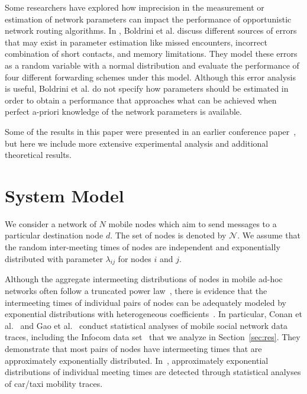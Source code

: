 \documentclass[journal,onecolumn,11pt]{IEEEtran}
\theoremstyle{plain}
\theoremstyle{definition}
\begin{document}
Some researchers have explored how imprecision in the measurement
or estimation of network parameters can impact the performance of
opportunistic network routing algorithms. In \cite
{boldrini2010modelling, boldrini2012performance}, Boldrini
et al. discuss different sources of errors that may exist in parameter
estimation like missed encounters, incorrect combination of short
contacts, and memory limitations. They model these errors
as a random variable with a normal distribution and evaluate the
performance of four different forwarding schemes under this
model. Although this error analysis is useful, Boldrini et al. do not
specify how parameters should be estimated in order to obtain a
performance that approaches what can be achieved when perfect a-priori
knowledge of the network parameters is available.

Some of the results in this paper were presented in an earlier
conference paper~\cite{shaghaghian2014opportunistic}, but here we include more extensive experimental
analysis and additional theoretical results.

\section{System Model} \label{sec:system_model}
We consider a network of $N$ mobile nodes which aim to send messages
to a particular destination node $d$. The set of nodes is denoted by
$\mathcal{N}$. We assume that the random inter-meeting times of nodes
are independent and exponentially distributed with parameter
$\lambda_{ij}$ for nodes $i$ and $j$. 

Although the aggregate intermeeting distributions of nodes in mobile
ad-hoc networks often follow a truncated power
law~\cite{cai2009,chaintreau2007impact}, there is evidence that the
intermeeting times of individual pairs of nodes can be adequately
modeled by exponential distributions with heterogeneous
coefficients~\cite{conan2007,gao2009,lee2010,zhu2010}. In particular,
Conan et al.~\cite{conan2007} and Gao et al.~\cite{gao2009} conduct
statistical analyses of mobile social network data traces, including
the Infocom data set~\cite{cambridge-haggle-2006-01-31} that we
analyze in Section~\ref{sec:res}. They demonstrate that most pairs of
nodes have intermeeting times that are approximately exponentially
distributed. In~\cite{lee2010,zhu2010}, approximately exponential
distributions of individual meeting times are detected through
statistical analyses of car/taxi mobility traces.
\end{document}
